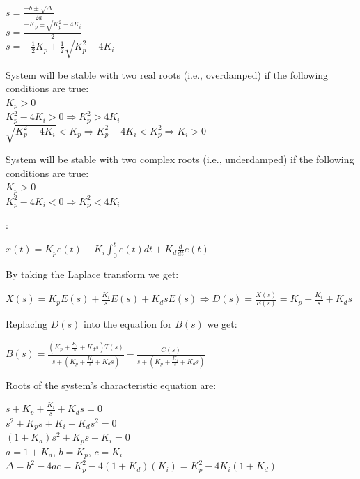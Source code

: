 \documentclass{article}
\begin{document}
\begin{enumerate}
\begin{itemize}
\noindent $s = {\frac{-b \pm \sqrt{\Delta}}{2a}}$\\

\noindent $s = {\frac{-K_p \pm \sqrt{K_p^2 - 4K_i}}{2}}$\\

\noindent $s = -{\frac{1}{2}}K_p \pm {\frac{1}{2}} \sqrt{K_p^2 -
4K_i}$ \bigbreak

\noindent System will be stable with two real roots (i.e., overdamped) if the
following conditions are true:\\
\noindent $K_p > 0$\\
\noindent $K_p^2 - 4K_i > 0 \Rightarrow K_p^2 > 4K_i$\\
\noindent $\sqrt{K_p^2 - 4K_i} < K_p \Rightarrow K_p^2 - 4K_i <
K_p^2 \Rightarrow K_i > 0$ \bigbreak

\noindent System will be stable with two complex roots (i.e., underdamped) if the
following conditions are true:\\
\noindent $K_p > 0$\\
\noindent $K_p^2 - 4K_i < 0 \Rightarrow K_p^2 < 4K_i$

\bigbreak \bigbreak

: \smallbreak

\noindent $x(t) = K_p e(t) + K_i \int^t_0 e(t) dt + K_d
{\frac{d}{dt}} e(t)$ \bigbreak

\noindent By taking the Laplace transform we get: \smallbreak

\noindent $X(s) = K_p E(s) + {\frac{K_i}{s}} E(s) + K_d s E(s)
\Rightarrow D(s) = {\frac{X(s)}{E(s)}} = K_p + {\frac{K_i}{s}} +
K_d s$ \bigbreak

\noindent Replacing $D(s)$ into the equation for $B(s)$ we get:
\smallbreak

\noindent $B(s) = {\frac{(K_p + {\frac{K_i}{s}} + K_d s) T(s)}{s +
(K_p + {\frac{K_i}{s}} + K_d s)}} - {\frac{C(s)}{s + (K_p +
{\frac{K_i}{s}} + K_d s)}}$ \bigbreak

\noindent Roots of the system's characteristic equation are:
\smallbreak

\noindent $s + K_p + {\frac{K_i}{s}} + K_d s = 0$\\
\noindent $s^2 + K_ps + K_i + K_d s^2 = 0$\\
\noindent $(1+K_d)s^2 + K_p s + K_i = 0$\\
\noindent $a = 1+K_d$, $b = K_p$, $c = K_i$\\
\noindent $\Delta = b^2 - 4ac = K_p^2 - 4(1+K_d)(K_i) = K_p^2 - 4
K_i(1+K_d)$ \bigbreak


\end{itemize}
\end{enumerate}
\end{document}
